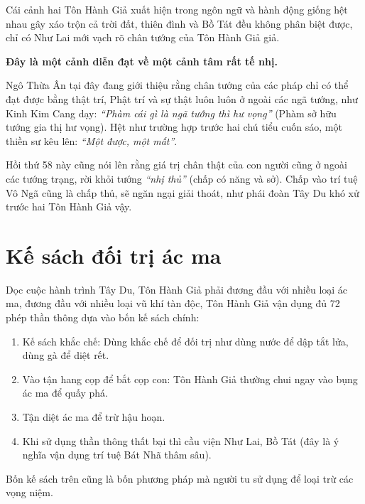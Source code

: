 Cái cảnh hai Tôn Hành Giả xuất hiện trong ngôn ngữ và hành động giống hệt nhau gây xáo trộn cả trời đất, thiên đình và Bồ Tát đều không phân biệt được, chỉ có Như Lai mới vạch rõ chân tướng của Tôn Hành Giả giả.

{\bf Đây là một cảnh diễn đạt về một cảnh tâm rất tế nhị.}

Ngô Thừa Ân tại đây đang giới thiệu rằng chân tướng của các pháp chỉ có thể đạt được bằng thật trí, Phật trí và sự thật luôn luôn ở ngoài các ngã tướng, như Kinh Kim Cang dạy: \emph{``Phàm cái gì là ngã tướng thì hư vọng''} (Phàm sở hữu tướng gia thị hư vọng). Hệt như trường hợp trước hai chú tiểu cuốn sáo, một thiền sư kêu lên: \emph{``Một được, một mất''}.

Hồi thứ 58 này cũng nói lên rằng giá trị chân thật của con người cũng ở ngoài các tướng trạng, rời khỏi tướng \emph{``nhị thủ''} (chấp có năng và sở). Chấp vào trí tuệ Vô Ngã cũng là chấp thủ, sẽ ngăn ngại giải thoát, như phái đoàn Tây Du khó xử trước hai Tôn Hành Giả vậy.

\section{Kế sách đối trị ác ma} %
\label{sec:ke_sach_doi_tri_ac_ma}

Dọc cuộc hành trình Tây Du, Tôn Hành Giả phải đương đầu với nhiều loại ác ma, đương đầu với nhiều loại vũ khí tàn độc, Tôn Hành Giả vận dụng đủ 72 phép thần thông dựa vào bốn kế sách chính:

\begin{enumerate}[label=\itshape\arabic*\upshape/]
    \item Kế sách khắc chế: Dùng khắc chế để đối trị như dùng nước để dập tắt lửa, dùng gà để diệt rết.

    \item Vào tận hang cọp để bắt cọp con: Tôn Hành Giả thường chui ngay vào bụng ác ma để quấy phá.

    \item Tận diệt ác ma để trừ hậu hoạn.

    \item Khi sử dụng thần thông thất bại thì cầu viện Như Lai, Bồ Tát (đây là ý nghĩa vận dụng trí tuệ Bát Nhã thâm sâu).
\end{enumerate}

Bốn kế sách trên cũng là bốn phương pháp mà người tu sử dụng để loại trừ các vọng niệm.

